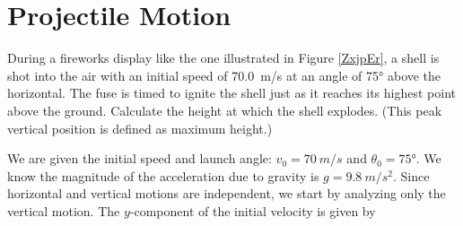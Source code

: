 \documentclass[main-physics.tex]{subfiles}
\begin{document}
\clearpage
\printnoidxglossaries


\clearpage

\section{Projectile Motion}




\begin{example} \label{4Dn9PW}
    During a fireworks display like the one illustrated in Figure \ref{ZxjpEr}, a shell is shot into the air with an initial speed of \SI{70.0}{m/s} at an angle of \ang{75} above the horizontal. The fuse is timed to ignite the shell just as it reaches its highest point above the ground. Calculate the height at which the shell explodes. (This peak vertical position is defined as \gls{maximum height}.)
\end{example}

\begin{center}
    \captionsetup{type=figure,margin=1in,font=scriptsize}
    \label{ZxjpEr}
\end{center}

\Solution We are given the initial speed and launch angle: $v_0 = \SI{70}{m/s}$ and $\theta_0 = \ang{75}$. We know the magnitude of the acceleration due to gravity is $g = \SI{9.8}{m/s^2}$. Since horizontal and vertical motions are independent, we start by analyzing only the vertical motion. The $y$-component of the initial velocity is given by
\end{document}
